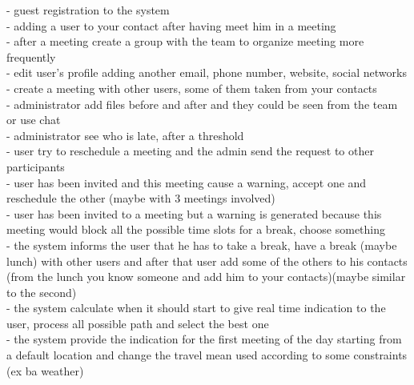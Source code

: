 - guest registration  to the system \\
- adding a user to your contact after having meet him in a meeting \\
- after a meeting create a group with the team to organize meeting more frequently \\
- edit user's profile adding another email, phone number, website, social networks \\
- create a meeting with other users, some of them taken from your contacts\\
- administrator add files before and after and they could be seen from the team or use chat\\
- administrator see who is late, after a threshold\\
- user try to reschedule a meeting and the admin send the request to other participants\\
- user has been invited and this meeting cause a warning, accept one and reschedule the other (maybe with 3 meetings involved)\\
- user has been invited to a meeting but a warning is generated because this meeting would block all the possible time slots for a break, choose something\\
- the system informs the user that he has to take a break, have a break (maybe lunch) with other users and after that user add some of the others to his contacts (from the lunch you know someone and add him to your contacts)(maybe similar to the second)\\
- the system calculate when it should start to give real time indication to the user, process all possible path and select the best one\\
- the system provide the indication for the first meeting of the day starting from a default location and change the travel mean used according to some constraints (ex ba weather)\\